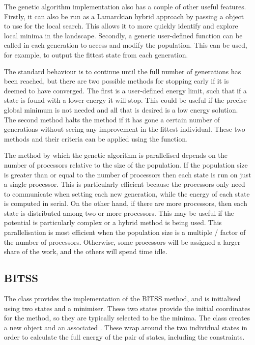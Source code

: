 The genetic algorithm implementation also has a couple of other useful features.
Firstly, it can also be run as a Lamarckian hybrid approach by passing a  object to use for the local search.
This allows it to more quickly identify and explore local minima in the landscape.
Secondly, a generic user-defined function can be called in each generation to access and modify the population.
This can be used, for example, to output the fittest state from each generation.

The standard behaviour is to continue until the full number of generations has been reached, but there are two possible methods for stopping early if it is deemed to have converged.
The first is a user-defined energy limit, such that if a state is found with a lower energy it will stop.
This could be useful if the precise global minimum is not needed and all that is desired is a low energy solution.
The second method halts the method if it has gone a certain number of generations without seeing any improvement in the fittest individual.
These two methods and their criteria can be applied using the  function.

The method by which the genetic algorithm is parallelised depends on the number of processors relative to the size of the population.
If the population size is greater than or equal to the number of processors then each state is run on just a single processor.
This is particularly efficient because the processors only need to communicate when setting each new generation, while the energy of each state is computed in serial.
On the other hand, if there are more processors, then each state is distributed among two or more processors.
This may be useful if the potential is particularly complex or a hybrid method is being used.
This parallelisation is most efficient when the population size is a multiple / factor of the number of processors.
Otherwise, some processors will be assigned a larger share of the work, and the others will spend time idle.

\subsection{BITSS}
The  class provides the implementation of the BITSS method, and is initialised using two states and a minimiser.
These two states provide the initial coordinates for the method, so they are typically selected to be the minima.
The  class creates a new  object and an associated .
These wrap around the two individual states in order to calculate the full energy of the pair of states, including the constraints.

